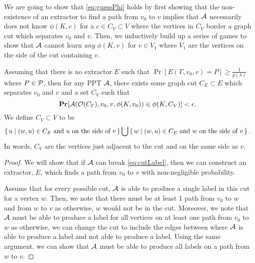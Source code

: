 We are going to show that \cref{eq:guessPhi} holds by first showing that
the non-existence of an extractor to find a path from $v_0$ to $v$ implies that $\mathcal{A}$
necessarily does not know $\phi(K, c)$ for a $c \in C_V \subset V$ where the vertices in $C_V$ border 
a graph cut which separates $v_0$ and $v$. Then, we inductively build up a series of games to show that
$\mathcal{A}$ cannot learn \emph{any} $\phi(K, v)$ for $v \in V_1$ where $V_1$ are the vertices on the side of the cut containing $v$.

\begin{lemma}
	\label{lemma:cutBaseCase}
	Assuming that there is no extractor $E$ such that $\Pr[E(\Gamma, v_0, v) = P] \geq \frac{1}{p(\lambda)}$
	where $P \in \mathcal{P}$, then for any PPT $\mathcal{A}$, there exists some graph cut 
	$C_E \subset E$ which separates $v_0$ and $v$ and a set $C_V$ such that
	\begin{equation}
		\label{eq:cutLabel}
		\operatorname*{\mathbf{Pr}}[\mathcal{A}(\mathcal{O}(C_\Gamma), v_0, v, \phi(K, v_0)) \in \phi(K, C_V)] < \epsilon.
	\end{equation}
		We define $C_V \subset V$ to be
	\begin{equation*}
		\set{ u \mid (w, u) \in C_E \text{ and } u \text { on the side of } v} \bigcup \set{ w \mid (w, u) \in C_E \text{ and } w \text { on the side of } v}.
	\end{equation*}
	In words, $C_V$ are the vertices just adjacent to the cut and on the same side as $v$.
	\begin{proof}
		We will show that if $\mathcal{A}$ can break \cref{eq:cutLabel}, then we can construct an extractor,
		$E$, which finds a path from $v_0$ to $v$ with non-negligible probability.

		Assume that for every possible cut, $\mathcal{A}$ is able to produce a single label in this cut for a vertex $w$.
		Then, we note that there must be at least 1 path from $v_0$ to $w$ and from $w$ to $v$ as otherwise, $w$ would not be in the cut.
		Moreover, we note that $\mathcal{A}$ must be able to produce a label for all vertices on at least one path
		from $v_0$ to $w$ as otherwise, we can change the cut to include the edges between where
		$\mathcal{A}$ is able to produce a label and not able to produce a label. Using the same argument,
		we can show that $\mathcal{A}$ must be able to produce all labels on a path from $w$ to $v$.


\end{proof}
\end{lemma}

